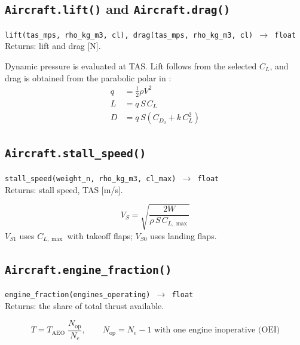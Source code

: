 \documentclass[11pt,letterpaper]{article}
\numberwithin{equation}{section}
\newcommand{\func}[2]{\begin{funcbox}\texttt{#1}\\[2pt]{\color{ink3}Returns:} #2\end{funcbox}}
\newcommand{\code}[1]{\textmd{\texttt{#1}}}
\begin{document}
\subsection{\code{Aircraft.lift()} and \code{Aircraft.drag()}}
\func{lift(tas\_mps, rho\_kg\_m3, cl), drag(tas\_mps, rho\_kg\_m3, cl) $\rightarrow$ float}{lift and drag [N].}
Dynamic pressure is evaluated at TAS. Lift follows from the selected $C_L$, and drag is obtained from the parabolic polar in \cite[Ch.~6]{ANDERSON-APD}:
\begin{align}
q &= \tfrac12\rho V^2 \label{eq:q}\\
L &= q\,S\,C_L \label{eq:L}\\
D &= q\,S\left(C_{D_0} + k\,C_L^2\right) \label{eq:D}
\end{align}

\subsection{\code{Aircraft.stall\_speed()}}
\func{stall\_speed(weight\_n, rho\_kg\_m3, cl\_max) $\rightarrow$ float}{stall speed, TAS [m/s].}
\begin{equation}
V_S = \sqrt{\frac{2W}{\rho\,S\,C_{L,\max}}} \label{eq:Vs}
\end{equation}
$V_{S1}$ uses $C_{L,\max}$ with takeoff flaps; $V_{S0}$ uses landing flaps.

\subsection{\code{Aircraft.engine\_fraction()}}
\func{engine\_fraction(engines\_operating) $\rightarrow$ float}{the share of total thrust available.}
\begin{equation}
T = T_\text{AEO}\;\frac{N_\text{op}}{N_e}, \qquad N_\text{op} = N_e - 1 \text{ with one engine inoperative (OEI)} \label{eq:oei}
\end{equation}
\end{document}
